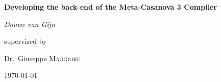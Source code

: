 \documentclass[12pt,a4paper]{report}
\begin{document}
\begin{titlepage}
	\centering
	       {\huge\bfseries Developing the back-end of the Meta-Casanova 3 Compiler\par}
	\vspace{2cm}
	{\Large\itshape Douwe van Gijn\par}
	\vfill
	supervised by\par
	Dr.~Giuseppe \textsc{Maggiore}
	\vfill
	{\large \today\par}
\end{titlepage}
\end{document}
